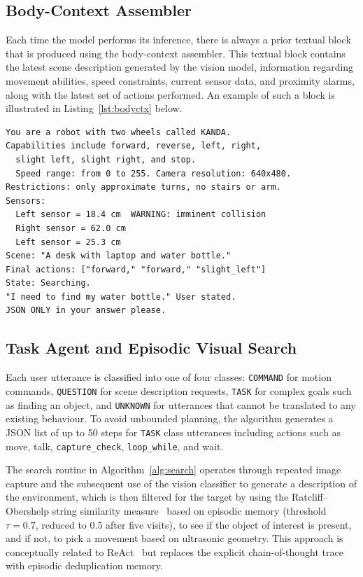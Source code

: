 \documentclass[conference]{IEEEtran}
\begin{document}
\subsection{Body-Context Assembler}
\label{sec:bodyctx}

Each time the model performs its inference, there is always a prior textual block that is produced using the body-context assembler. This textual block contains the latest scene description generated by the vision model, information regarding movement abilities, speed constraints, current sensor data, and proximity alarms, along with the latest set of actions performed. An example of such a block is illustrated in Listing~\ref{lst:bodyctx} below.

\begin{lstlisting}[caption={Body-context block (rebuilt each inference call)},
  label={lst:bodyctx}, float=tp]
You are a robot with two wheels called KANDA.
Capabilities include forward, reverse, left, right,
  slight left, slight right, and stop.
  Speed range: from 0 to 255. Camera resolution: 640x480.
Restrictions: only approximate turns, no stairs or arm.
Sensors:
  Left sensor = 18.4 cm  WARNING: imminent collision
  Right sensor = 62.0 cm
  Left sensor = 25.3 cm
Scene: "A desk with laptop and water bottle."
Final actions: ["forward," "forward," "slight_left"]
State: Searching.
"I need to find my water bottle." User stated.
JSON ONLY in your answer please.
\end{lstlisting}

\subsection{Task Agent and Episodic Visual Search}
\label{sec:search}

Each user utterance is classified into one of four classes: \texttt{COMMAND} for motion commands, \texttt{QUESTION} for scene description requests, \texttt{TASK} for complex goals such as finding an object, and \texttt{UNKNOWN} for utterances that cannot be translated to any existing behaviour. To avoid unbounded planning, the algorithm generates a JSON list of up to 50 steps for \texttt{TASK} class utterances including actions such as move, talk, \texttt{capture\_check}, \texttt{loop\_while}, and wait.

The search routine in Algorithm~\ref{alg:search} operates through repeated image capture and the subsequent use of the vision classifier to generate a description of the environment, which is then filtered for the target by using the Ratcliff--Obershelp string similarity measure~\cite{ratcliff1988} based on episodic memory (threshold $\tau{=}0.7$, reduced to 0.5 after five visits), to see if the object of interest is present, and if not, to pick a movement based on ultrasonic geometry. This approach is conceptually related to ReAct~\cite{yao2023react} but replaces the explicit chain-of-thought trace with episodic deduplication memory.
\end{document}
